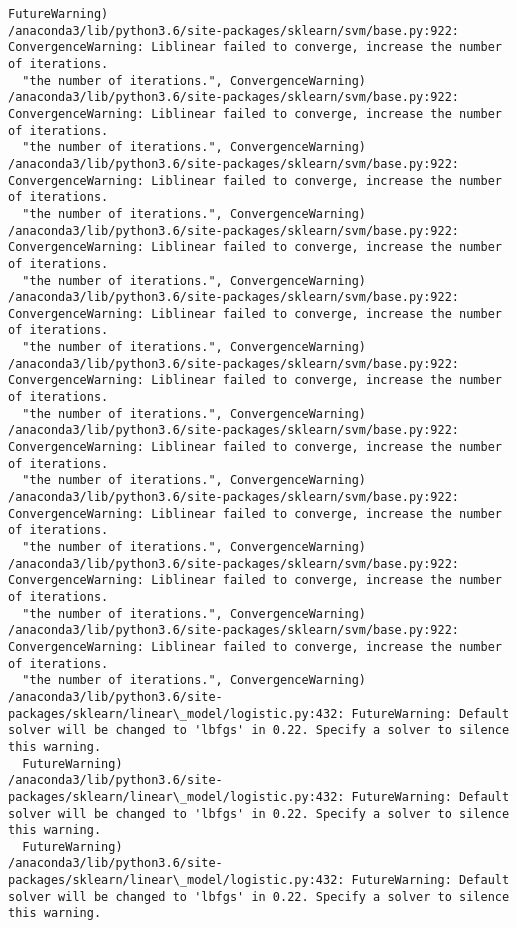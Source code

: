 \documentclass[11pt]{article}
\begin{document}
\begin{Verbatim}[commandchars=\\\{\}]
  FutureWarning)
/anaconda3/lib/python3.6/site-packages/sklearn/svm/base.py:922: ConvergenceWarning: Liblinear failed to converge, increase the number of iterations.
  "the number of iterations.", ConvergenceWarning)
/anaconda3/lib/python3.6/site-packages/sklearn/svm/base.py:922: ConvergenceWarning: Liblinear failed to converge, increase the number of iterations.
  "the number of iterations.", ConvergenceWarning)
/anaconda3/lib/python3.6/site-packages/sklearn/svm/base.py:922: ConvergenceWarning: Liblinear failed to converge, increase the number of iterations.
  "the number of iterations.", ConvergenceWarning)
/anaconda3/lib/python3.6/site-packages/sklearn/svm/base.py:922: ConvergenceWarning: Liblinear failed to converge, increase the number of iterations.
  "the number of iterations.", ConvergenceWarning)
/anaconda3/lib/python3.6/site-packages/sklearn/svm/base.py:922: ConvergenceWarning: Liblinear failed to converge, increase the number of iterations.
  "the number of iterations.", ConvergenceWarning)
/anaconda3/lib/python3.6/site-packages/sklearn/svm/base.py:922: ConvergenceWarning: Liblinear failed to converge, increase the number of iterations.
  "the number of iterations.", ConvergenceWarning)
/anaconda3/lib/python3.6/site-packages/sklearn/svm/base.py:922: ConvergenceWarning: Liblinear failed to converge, increase the number of iterations.
  "the number of iterations.", ConvergenceWarning)
/anaconda3/lib/python3.6/site-packages/sklearn/svm/base.py:922: ConvergenceWarning: Liblinear failed to converge, increase the number of iterations.
  "the number of iterations.", ConvergenceWarning)
/anaconda3/lib/python3.6/site-packages/sklearn/svm/base.py:922: ConvergenceWarning: Liblinear failed to converge, increase the number of iterations.
  "the number of iterations.", ConvergenceWarning)
/anaconda3/lib/python3.6/site-packages/sklearn/svm/base.py:922: ConvergenceWarning: Liblinear failed to converge, increase the number of iterations.
  "the number of iterations.", ConvergenceWarning)
/anaconda3/lib/python3.6/site-packages/sklearn/linear\_model/logistic.py:432: FutureWarning: Default solver will be changed to 'lbfgs' in 0.22. Specify a solver to silence this warning.
  FutureWarning)
/anaconda3/lib/python3.6/site-packages/sklearn/linear\_model/logistic.py:432: FutureWarning: Default solver will be changed to 'lbfgs' in 0.22. Specify a solver to silence this warning.
  FutureWarning)
/anaconda3/lib/python3.6/site-packages/sklearn/linear\_model/logistic.py:432: FutureWarning: Default solver will be changed to 'lbfgs' in 0.22. Specify a solver to silence this warning.

\end{Verbatim}
\end{document}
